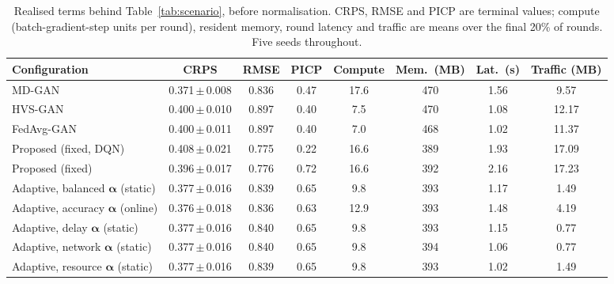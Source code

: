 \begin{table}[!t]\centering
\caption{Realised terms behind Table~\ref{tab:scenario}, before normalisation. CRPS, RMSE and PICP are terminal values; compute (batch-gradient-step units per round), resident memory, round latency and traffic are means over the final 20\% of rounds. Five seeds throughout.}
\label{tab:terms}
\begin{tabular}{lccccccc}\toprule
Configuration & CRPS & RMSE & PICP & Compute & Mem.\ (MB) & Lat.\ (s) & Traffic (MB) \\\midrule
MD-GAN & 0.371\,$\pm$\,0.008 & 0.836 & 0.47 & 17.6 & 470 & 1.56 & 9.57 \\
HVS-GAN & 0.400\,$\pm$\,0.010 & 0.897 & 0.40 & 7.5 & 470 & 1.08 & 12.17 \\
FedAvg-GAN & 0.400\,$\pm$\,0.011 & 0.897 & 0.40 & 7.0 & 468 & 1.02 & 11.37 \\
Proposed (fixed, DQN) & 0.408\,$\pm$\,0.021 & 0.775 & 0.22 & 16.6 & 389 & 1.93 & 17.09 \\
Proposed (fixed) & 0.396\,$\pm$\,0.017 & 0.776 & 0.72 & 16.6 & 392 & 2.16 & 17.23 \\
\midrule
Adaptive, balanced $\boldsymbol{\alpha}$ (static) & 0.377\,$\pm$\,0.016 & 0.839 & 0.65 & 9.8 & 393 & 1.17 & 1.49 \\
Adaptive, accuracy $\boldsymbol{\alpha}$ (online) & 0.376\,$\pm$\,0.018 & 0.836 & 0.63 & 12.9 & 393 & 1.48 & 4.19 \\
Adaptive, delay $\boldsymbol{\alpha}$ (static) & 0.377\,$\pm$\,0.016 & 0.840 & 0.65 & 9.8 & 393 & 1.15 & 0.77 \\
Adaptive, network $\boldsymbol{\alpha}$ (static) & 0.377\,$\pm$\,0.016 & 0.840 & 0.65 & 9.8 & 394 & 1.06 & 0.77 \\
Adaptive, resource $\boldsymbol{\alpha}$ (static) & 0.377\,$\pm$\,0.016 & 0.839 & 0.65 & 9.8 & 393 & 1.02 & 1.49 \\
\bottomrule\end{tabular}\end{table}
